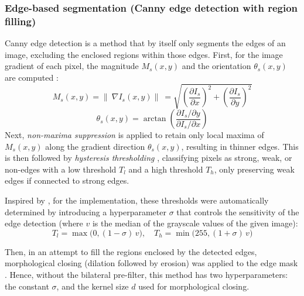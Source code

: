 \subsubsection{Edge-based segmentation (Canny edge detection with region filling)}
Canny edge detection \parencite{Canny1986} is a method that by itself only segments the edges of an image, excluding the enclosed regions within those edges.
First, for the image gradient of each pixel, the magnitude $M_s(x,y)$ and the orientation $\theta_s(x,y)$ are computed \parencite[p.~730]{DigitalImageProcessing}:
$$M_s(x,y) = \|\ \nabla I_{s}(x,y) \|\ = \sqrt{\left(\frac{\partial I_{s}}{\partial x}\right)^2 + \left(\frac{\partial I_{s}}{\partial y}\right)^2}$$ 
$$\theta_s(x,y) = \arctan \left( \frac{\partial I_{s}/\partial y}{\partial I_{s}/\partial x} \right)$$
Next, \textit{non-maxima suppression} \parencite[p.~730-731]{DigitalImageProcessing} is applied to retain only local maxima of $M_s(x,y)$ along the gradient direction $\theta_s(x,y)$, resulting in thinner edges.
This is then followed by \textit{hysteresis thresholding} \parencite[p.~732]{DigitalImageProcessing}, classifying pixels as strong, weak, or non-edges with a low threshold $T_l$ and a high threshold $T_h$, only preserving weak edges if connected to strong edges.

Inspired by \parencite{autocanny}, for the implementation, these thresholds were automatically determined by introducing a hyperparameter $\sigma$ that controls the sensitivity of the edge detection (where $v$ is the median of the grayscale values of the given image):
$$
T_l = \max\bigl(0, (1 - \sigma)\, v\bigr), \quad
T_h = \min\bigl(255, (1 + \sigma)\, v\bigr)
$$

\noindent Then, in an attempt to fill the regions enclosed by the detected edges, morphological closing (dilation followed by erosion) was applied to the edge mask \parencite[p.~636--638]{DigitalImageProcessing}.
Hence, without the bilateral pre-filter, this method has two hyperparameters: the constant $\sigma$, and the kernel size $d$ used for morphological closing.


